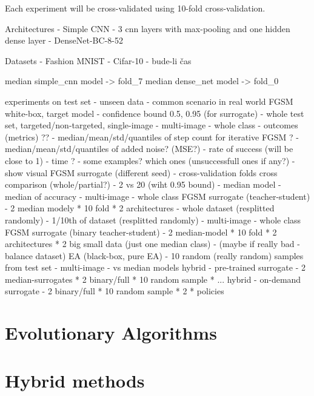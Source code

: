 Each experiment will be cross-validated using 10-fold cross-validation.

Architectures
- Simple CNN - 3 cnn layers with max-pooling and one hidden dense layer
- DenseNet-BC-8-52

Datasets
- Fashion MNIST
- Cifar-10 - bude-li čas

median simple\_cnn model -> fold\_7
median dense\_net model -> fold\_0

experiments on test set - unseen data - common scenario in real world
FGSM white-box, target model - confidence bound 0.5, 0.95 (for surrogate)
- whole test set, targeted/non-targeted, single-image
- multi-image - whole class
- outcomes (metrics) ??
    - median/mean/std/quantiles of step count for iterative FGSM ?
    - median/mean/std/quantiles of added noise? (MSE?)
    - rate of success (will be close to 1)
    - time ?
    - some examples? which ones (unsuccessfull ones if any?)
    	- show visual
FGSM surrogate (different seed)
- cross-validation folds cross comparison (whole/partial?)
- 2 vs 20 (wiht 0.95 bound) - median model - median of accuracy
- multi-image - whole class
FGSM surrogate (teacher-student)
- 2 median modely * 10 fold * 2 architectures
- whole dataset (resplitted randomly)
- 1/10th of dataset (resplitted randomly)
- multi-image - whole class
FGSM surrogate (binary teacher-student)
- 2 median-model * 10 fold * 2 architectures * 2 big small data (just one median class)
- (maybe if really bad - balance dataset)
EA (black-box, pure EA)
- 10 random (really random) samples from test set
- multi-image
- vs median models
hybrid - pre-trained surrogate
- 2 median-surrogates * 2 binary/full * 10 random sample * ...
hybrid - on-demand surrogate
- 2 binary/full * 10 random sample * 2 * policies


\section{Evolutionary Algorithms}
\section{Hybrid methods}

